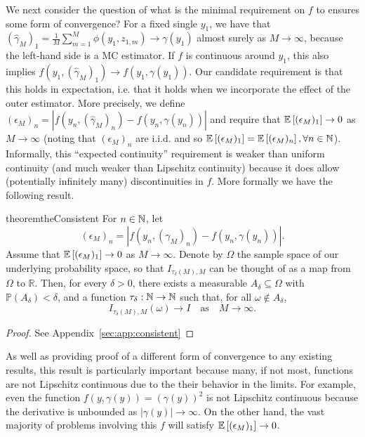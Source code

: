 We next consider the question of what is the minimal requirement on $f$ to ensures some form of
convergence? For a fixed single $y_1$, we
have that $(\hat{\gamma}_M)_1=\frac{1}{M}\sum_{m=1}^{M} \phi(y_1,z_{1,m})\rightarrow\gamma(y_1)$ 
almost surely as $M \rightarrow \infty$, because the left-hand side is a MC estimator. If $f$ is continuous
around $y_1$, this also implies $f(y_1,(\hat{\gamma}_M)_1) \rightarrow
f(y_1,\gamma(y_1))$.  Our candidate requirement is that this holds in
expectation, i.e. that it holds when we incorporate the effect of the outer estimator.
More precisely, we define $(\epsilon_M)_n = \left|f(y_n, (\hat{\gamma}_M)_n) -
f(y_n,\gamma(y_n))\right|$ and require that $\mathbb{E}\left[(\epsilon_M)_1\right] \to 0$ as $M
\to \infty$ (noting that $(\epsilon_M)_n$ are i.i.d. and so
$\mathbb{E}\left[(\epsilon_M)_1\right] = \mathbb{E}\left[(\epsilon_M)_n\right], \forall n\in\mathbb{N}$). Informally, this ``expected continuity''
requirement is weaker than uniform continuity (and much weaker than Lipschitz continuity)
because it does allow (potentially infinitely
many) discontinuities in $f$.  More formally we have the following result.
\begin{restatable}{theorem}{theConsistent} \label{the:Consistent}
	For $n \in \mathbb{N}$, let 
	\[
	(\epsilon_M)_n = \left|f(y_n, (\hat{\gamma}_M)_n) - f(y_n, \gamma(y_n))\right|.
	\]
  Assume that $\mathbb{E}\left[(\epsilon_M)_1\right] \to 0$  as $M \to \infty$. Denote by $\Omega$
  the sample space of our underlying probability space, so that $I_{\tau_\delta(M),M}$ can
  be thought of as a map from $\Omega$ to $\mathbb{R}$. Then, for every $\delta > 0$,
  there exists a measurable $A_\delta \subseteq \Omega$ with $\mathbb{P}(A_\delta) <
  \delta$, and a function $\tau_\delta : \mathbb{N} \to \mathbb{N}$ such that, for all $\omega\not\in
  A_\delta$,
	\[ 
		I_{\tau_\delta(M),M}(\omega) \to I\quad\mbox{as}\quad M \to \infty.
	\]
\end{restatable}
\begin{proof}
	See Appendix~\ref{sec:app:consistent}
\end{proof}
As well as providing proof of a different form of convergence to any existing results, this
result is particularly important because many, if not most, functions are not Lipschitz
continuous due to the their behavior in the limits.  For example, even the function $f(y,\gamma(y)) = \left(\gamma(y)\right)^2$
is not Lipschitz continuous because the derivative is unbounded as $\left|\gamma(y)\right|\rightarrow\infty$.
On the other hand, the vast majority of problems involving this $f$ will satisfy $\mathbb{E}\left[(\epsilon_M)_1\right] \to 0$.


